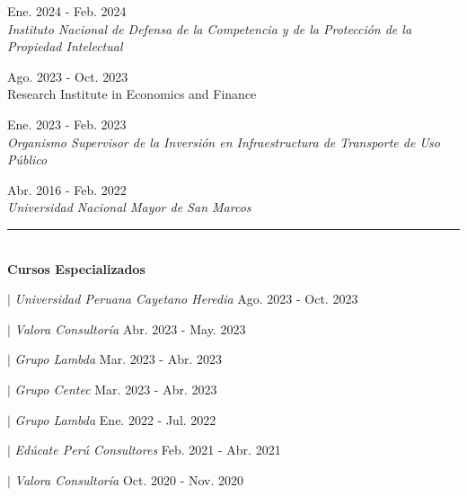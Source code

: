 \documentclass{resume}
\begin{document}
 \hfill {Ene. 2024 - Feb. 2024} \\
{\it Instituto Nacional de Defensa de la Competencia y de la Protección de la Propiedad Intelectual}
\vspace{3pt}

 \hfill {Ago. 2023 - Oct. 2023} \\
{Research Institute in Economics and Finance}
\vspace{3pt}

 \hfill {Ene. 2023 - Feb. 2023} \\
{\it Organismo Supervisor de la Inversión en Infraestructura de Transporte de Uso Público}
\vspace{3pt}

 \hfill {Abr. 2016 - Feb. 2022} \\
{\it Universidad Nacional Mayor de San Marcos}
\vspace{3pt}


{\color{vino} \noindent \rule{\textwidth}{1pt}} \\
{\color{vino} \noindent \faBook \; {\large \bf Cursos Especializados}}
\vspace{3pt}

 $|$ {\it Universidad Peruana Cayetano Heredia} \hfill {Ago. 2023 - Oct. 2023} \par
{} $|$ {\it Valora Consultoría} \hfill {Abr. 2023 - May. 2023} \par
{} $|$ {\it Grupo Lambda} \hfill {Mar. 2023 - Abr. 2023} \par
{} $|$ {\it Grupo Centec} \hfill {Mar. 2023 - Abr. 2023} \par
{} $|$ {\it Grupo Lambda} \hfill {Ene. 2022 - Jul. 2022} \par
{} $|$ {\it Edúcate Perú Consultores} \hfill {Feb. 2021 - Abr. 2021} \par
{} $|$ {\it Valora Consultoría} \hfill {Oct. 2020 - Nov. 2020} \par
\vspace{3pt}
\end{document}
